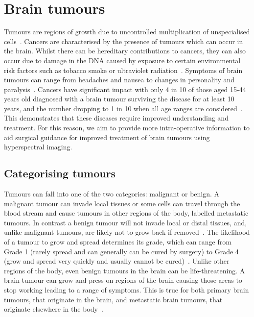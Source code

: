 \section{Brain tumours}\label{sec:braintumours}
Tumours are regions of growth due to uncontrolled multiplication of unspecialised cells~\citep{WorldHealthOrganisation2023}. Cancers are characterised by the presence of tumours which can occur in the brain. Whilst there can be hereditary contributions to cancers, they can also occur due to damage in the DNA caused by exposure to certain environmental risk factors such as tobacco smoke or ultraviolet radiation~\citep{WorldHealthOrganisation2023}. 
Symptoms of brain tumours can range from headaches and nausea to changes in personality and paralysis~\citep{NationalHealthService2023}. 
Cancers have significant impact with only 4 in 10 of those aged 15-44 years old diagnosed with a brain tumour surviving the disease for at least 10 years, and the number dropping to 1 in 10 when all age ranges are considered~\citep{CancerResearchUK2023}. This demonstrates that these diseases require improved understanding and treatment. For this reason, we aim to provide more intra-operative information to aid surgical guidance for improved treatment of brain tumours using hyperspectral imaging. 

\subsection{Categorising tumours} 
Tumours can fall into one of the two categories: malignant or benign. A malignant tumour can invade local tissues or some cells can travel through the blood stream and cause tumours in other regions of the body, labelled metastatic tumours. In contrast a benign tumour will not invade local or distal tissues, and, unlike malignant tumours, are likely not to grow back if removed~\citep{Institute2021}. The likelihood of a tumour to grow and spread determines its grade, which can range from Grade 1 (rarely spread and can generally can be cured by surgery) to Grade 4 (grow and spread very quickly and usually cannot be cured)~\citep{Institute2023}. Unlike other regions of the body, even benign tumours in the brain can be life-threatening. A brain tumour can grow and press on regions of the brain causing those areas to stop working leading to a range of symptoms. This is true for both primary brain tumours, that originate in the brain, and metastatic brain tumours, that originate elsewhere in the body~\citep{Institute2021}.


